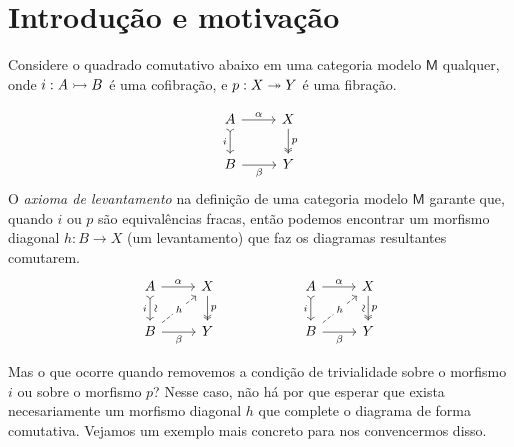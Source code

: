 



\maketitle


\section{Introdução e motivação}

Considere o quadrado comutativo abaixo em uma categoria modelo $\mathsf{M}$ qualquer, onde $i: A \rightarrowtail B$ é uma cofibração, e $p: X \twoheadrightarrow Y$ é uma fibração.

\begin{displaymath}
  \begin{tikzcd}
    A
    \arrow[r, "\alpha"]
    \arrow[d, tail, "i" swap]
    & X
    \arrow[d, two heads, "p"]
    \\ B
    \arrow[r, "\beta" swap]
    & Y
  \end{tikzcd}
\end{displaymath}
O \emph{axioma de levantamento} na definição de uma categoria modelo $\mathsf{M}$ garante que, quando $i$ ou $p$ são equivalências fracas, então podemos encontrar um morfismo diagonal $h: B \to X$  (um levantamento) que faz os diagramas resultantes comutarem.
\begin{displaymath}
  \begin{tikzcd}
     A
    \arrow[r, "\alpha"]
    \arrow[d, tail, "i" {swap}, "\sim" {sloped}]
    & X
    \arrow[d, two heads, "p"]
    \\ B
    \arrow[r, "\beta" swap]
    \arrow[ru, dashed, "h" description]
    & Y
  \end{tikzcd}
  \hspace{2cm}
  \begin{tikzcd}
     A
    \arrow[r, "\alpha"]
    \arrow[d, tail, "i" swap]
    & X
    \arrow[d, two heads, "p", "\sim" {swap,sloped}]
    \\ B
    \arrow[r, "\beta" swap]
    \arrow[ru, dashed, "h" description]
    & Y
  \end{tikzcd}
\end{displaymath}

Mas o que ocorre quando removemos a condição de trivialidade sobre o morfismo $i$ ou sobre o morfismo $p$?
Nesse caso, não há por que esperar que exista necesariamente um morfismo diagonal $h$ que complete o diagrama de forma comutativa.
Vejamos um exemplo mais concreto para nos convencermos disso.

